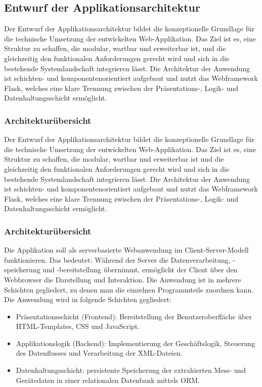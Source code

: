 \subsection{Entwurf der Applikationsarchitektur}
\label{subsec:entwurf-der-applikationsarchitektur}


Der Entwurf der Applikationsarchitektur bildet die konzeptionelle Grundlage für die technische Umsetzung der entwickelten Web-Applikation.
Das Ziel ist es, eine Struktur zu schaffen, die modular, wartbar und erweiterbar ist, und die gleichzeitig den funktionalen Anforderungen gerecht wird und sich in die bestehende Systemlandschaft integrieren lässt.
Die Architektur der Anwendung ist schichten- und komponentenorientiert aufgebaut und nutzt das Webframework Flask, welches eine klare Trennung zwischen der Präsentations-, Logik- und Datenhaltungsschicht ermöglicht.


\subsubsection{Architekturübersicht}


Der Entwurf der Applikationsarchitektur bildet die konzeptionelle Grundlage für die technische Umsetzung der entwickelten Web-Applikation.
Das Ziel ist es, eine Struktur zu schaffen, die modular, wartbar und erweiterbar ist und die gleichzeitig den funktionalen Anforderungen gerecht wird und sich in die bestehende Systemlandschaft integrieren lässt.
Die Architektur der Anwendung ist schichten- und komponentenorientiert aufgebaut und nutzt das Webframework Flask, welches eine klare Trennung zwischen der Präsentations-, Logik- und Datenhaltungsschicht ermöglicht.


\subsubsection{Architekturübersicht}
\label{subsubsec:arch}
Die Applikation soll als serverbasierte Webanwendung im Client-Server-Modell funktionieren.
Das bedeutet: Während der Server die Datenverarbeitung, -speicherung und -bereitstellung übernimmt, ermöglicht der Client über den Webbrowser die Darstellung und Interaktion.
Die Anwendung ist in mehrere Schichten gegliedert, zu denen man die einzelnen Programmteile zuordnen kann.
Die Anwendung wird in folgende Schichten gegliedert:

\begin{itemize}
\item Präsentationsschicht (Frontend): Bereitstellung der Benutzeroberfläche über HTML-Templates, CSS und JavaScript.

\item
Applikationslogik (Backend): Implementierung der Geschäftslogik, Steuerung des Datenflusses und Verarbeitung der XML-Dateien.

\item
Datenhaltungsschicht: persistente Speicherung der extrahierten Mess- und Gerätedaten in einer relationalen Datenbank mittels ORM.

\end{itemize}

